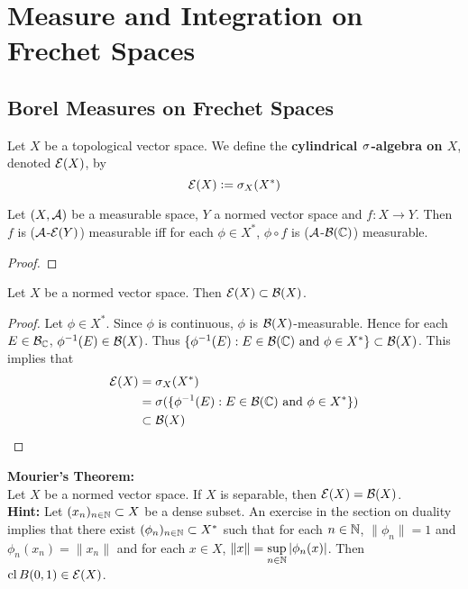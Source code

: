 \documentclass{book}
\begin{document}
	\newpage
\chapter{Measure and Integration on Frechet Spaces}

\section{Borel Measures on Frechet Spaces}

\begin{defn}
	Let $X$ be a topological vector space. We define the \textbf{cylindrical $\sigma$-algebra on $X$}, denoted $\mathcal{E}(X)$, by $$\mathcal{E}(X) \vcentcolon= \sigma_X(X^*)$$
\end{defn}

\begin{ex}
	Let $(X, \mathcal{A})$ be a measurable space, $Y$ a normed vector space and $f: X \rightarrow Y$. Then $f$ is ($\mathcal{A}$-$\mathcal{E}(Y)$) measurable iff for each $\phi \in X^*$, $\phi \circ f$ is ($\mathcal{A}$-$\mathcal{B}(\mathbb{C})$) measurable. 
\end{ex}

\begin{proof}
\end{proof}

\begin{ex}
	Let $X$ be a normed vector space. Then $\mathcal{E}(X) \subset \mathcal{B}(X)$.
\end{ex}

\begin{proof}
	Let $\phi \in X^*$. Since $\phi$ is continuous, $\phi$ is $\mathcal{B}(X)$-measurable. Hence for each $E \in \mathcal{B}_{\mathbb{C}}$, $\phi^{-1}(E) \in \mathcal{B}(X)$. Thus $\{ \phi^{-1}(E) : E \in \mathcal{B}(\mathbb{C}) \text{ and } \phi \in X^* \} \subset \mathcal{B}(X)$.  This implies that 
	\begin{align*}
		\mathcal{E}(X) 
		& = \sigma_X(X^*) \\
		& = \sigma(\{ \phi^{-1}(E):E \in \mathcal{B}(\mathbb{C}) \text{ and } \phi \in X^* \}) \\
		& \subset \mathcal{B}(X) 
	\end{align*} 
\end{proof}

\begin{ex} \textbf{Mourier's Theorem:} \\
	Let $X$ be a normed vector space. If $X$ is separable, then $\mathcal{E}(X) = \mathcal{B}(X)$. \\
	\textbf{Hint:} Let $(x_n)_{n \in \mathbb{N}} \subset X$ be a dense subset. An exercise in the section on duality implies that there exist $(\phi_n)_{n \in \mathbb{N}} \subset X^*$ such that for each $n \in \mathbb{N}$, $\|\phi_n\| = 1$ and $\phi_n(x_n) = \|x_n\|$ and for each $x \in X$, $\|x\| = \sup\limits_{n \in \mathbb{N}} |\phi_n(x)|$. Then $ \operatorname{cl} B(0, 1) \in \mathcal{E}(X)$.  
\end{ex}
\end{document}

